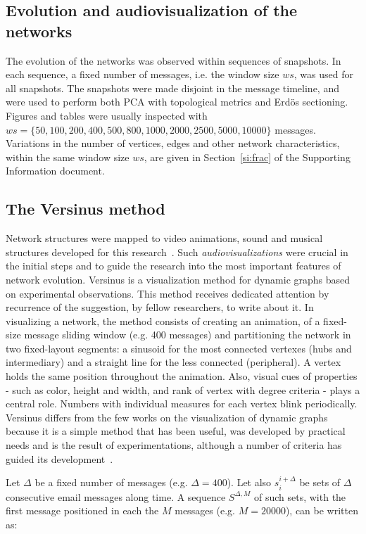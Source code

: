 \subsection{Evolution and audiovisualization of the networks}\label{sec:viz}
The evolution of the networks was observed within 
sequences of snapshots. In each sequence, a fixed number of messages,
i.e. the window size $ws$, was used for all snapshots.
The snapshots were made disjoint in the message timeline, and were used to perform both PCA with topological metrics and Erd\"os sectioning.  
Figures and tables were usually inspected with 
$ws=\{50, 100, 200, 400, 500, 800, 1000, 2000, 2500, 5000, 10000\}$ messages. Variations in the number of vertices, edges
and other network characteristics, within the same window size $ws$,
are given in Section~\ref*{si:frac} of the Supporting Information document. 

\subsection{The Versinus method}
Network structures were mapped to video animations, sound and musical structures developed for this research~\cite{animacoes}.%
Such \emph{audiovisualizations} were crucial in the initial steps and
to guide the research into the most important features of network evolution.
Versinus is a visualization method for dynamic graphs based on experimental observations.
This method receives dedicated attention by recurrence of the suggestion, by fellow researchers,
to write about it.  
In visualizing a network, the method consists of creating an animation,
of a fixed-size message sliding window (e.g. 400 messages) and 
partitioning the network in two fixed-layout segments:
a sinusoid for the most connected vertexes (hubs and intermediary)
and a straight line for the less connected (peripheral).
A vertex holds the same position throughout the animation. Also,
visual cues of properties - such as color, height and width,
and rank of vertex with degree criteria - plays a central role.
Numbers with individual measures for each vertex blink periodically.
Versinus differs from the few works on the visualization of dynamic
graphs because it is a simple method that has been useful,
was developed by practical needs and is the result of experimentations,
although a number of criteria has guided its development~\cite{Viz1,Viz2,Viz3}.

Let $\Delta$ be a fixed number of messages (e.g. $\Delta=400$).
Let also $s_{i}^{i+\Delta}$ be sets of $\Delta$ consecutive email messages along time.
A sequence $S^{\Delta,M}$ of such sets,
with the first message positioned in each the $M$ messages (e.g. $M=20000$),
can be written as: 

